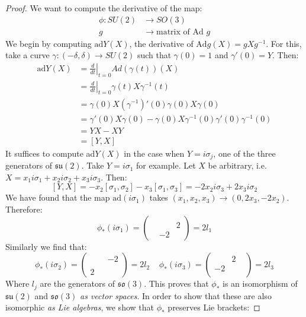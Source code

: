 \documentclass[12 pt]{article}
\begin{document}
\begin{proof}
We want to compute the derivative of the map:
\begin{align*}          \phi: SU(2) &\to SO(3)      \\   g &    \to \text{matrix of Ad } g  
\end{align*}
We begin by computing $\text{ad} Y (X)$, the derivative of $\text{Ad}g (X) = gXg^{-1}$. For this, take a curve $\gamma: (-\delta, \delta) \to SU(2)$ such that $\gamma(0) = 1$ and $\gamma'(0) = Y$. Then:
\begin{align*}      \text{ad} Y (X) &= \left. \frac{d}{dt}\right|_{t=0}  Ad(\gamma(t))(X)  \\
&= \left. \frac{d}{dt}\right|_{t=0} \gamma(t) X \gamma^{-1}(t) \\
&=   \gamma(0) X (\gamma^{-1})'(0)\gamma(0) X \gamma(0) \\
&= \gamma'(0) X \gamma(0) - \gamma(0) X\gamma^{-1}(0) \gamma'(0) \gamma^{-1}(0)  \\
&= YX - XY\\
&= [Y, X]
\end{align*}
It suffices to compute ad$Y(X)$ in the case when $Y = i\sigma_j$, one of the three generators of $\mathfrak{su}(2)$. Take $Y = i \sigma_1$ for example. Let $X$ be arbitrary, i.e. $X = x_1 i \sigma_1 + x_2 i \sigma_2 + x_3 i \sigma_3$. Then:
\[      [Y,X] = -x_2 [\sigma_1, \sigma_2] - x_3[\sigma_1, \sigma_3] = - 2x_2 i \sigma_3 + 2x_3i \sigma_2    \]
We have found that the map $\text{ad}(i\sigma_1)$ takes $(x_1, x_2, x_3) \to (0, 2x_3 , -2x_2)$. Therefore:
\[  \phi_*(i\sigma_1) = \left(   \begin{array} {ccc}  & & \\ & & 2 \\ & -2 &   \end{array} \right) = 2 l_1 \]
Similarly we find that:
\[     \phi_*(i\sigma_2) = \left(   \begin{array} {ccc}  & & -2 \\ & &  \\ 2&  &   \end{array} \right)= 2l_2  \;\;\;\;   \phi_*(i\sigma_3) = \left(   \begin{array} {ccc}  &2 & \\ -2 & &  \\ &  &   \end{array} \right)  = 2l_3                 \]
Where $l_j$ are the generators of $\mathfrak{so}(3)$. This proves that $\phi_*$ is an isomorphism of $\mathfrak{su}(2)$ and $\mathfrak{so}(3)$ \emph{as vector spaces}. In order to show that these are also isomorphic \emph{as Lie algebras}, we show that $\phi_*$ preserves Lie brackets:

\end{proof}
\end{document}
